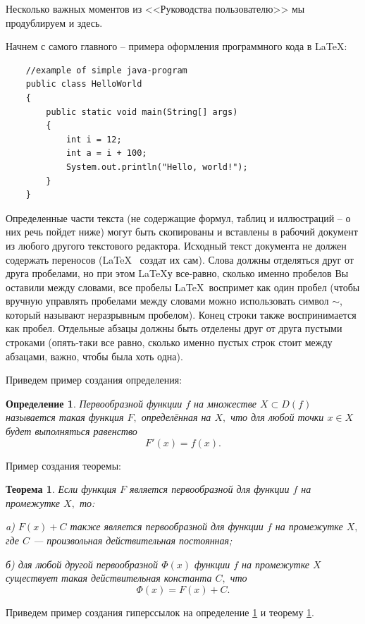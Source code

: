\documentclass[12pt, a4paper]{book}%
\newtheorem{theorem}{\indent \color{red}Теорема}[chapter]
\newtheorem{opr}{\indent \color{red}Определение}[chapter]
\begin{document}
{Несколько важных моментов из <<Руководства пользователю>> мы продублируем и здесь.

Начнем с самого главного -- примера оформления программного кода в \LaTeX:

\begin{lstlisting}
    //example of simple java-program
    public class HelloWorld
    {
        public static void main(String[] args)
        {
            int i = 12;
            int a = i + 100;
            System.out.println("Hello, world!");
        }
    }
\end{lstlisting}

Определенные части текста (не содержащие формул, таблиц и иллюстраций -- о них речь пойдет
ниже) могут быть скопированы и вставлены  в рабочий документ из любого
другого текстового редактора. Исходный текст документа не должен содержать переносов
(\LaTeX~ создат их сам). Слова должны отделяться
друг от друга пробелами, но при этом \LaTeX у все-равно, сколько именно пробелов Вы
оставили между
словами, все пробелы \LaTeX~воспримет как один пробел
 (чтобы вручную управлять пробелами между словами можно использовать символ
$\sim$, который называют неразрывным пробелом).
 Конец строки также воспринимается как пробел.
Отдельные абзацы должны быть отделены друг от друга пустыми строками (опять-таки все равно,
сколько именно пустых строк стоит между абзацами, важно, чтобы была хоть одна).

Приведем пример создания определения:

\begin{opr}\label{oprperv} \rm Первообразной функции $f$ на множестве $X{\subset}D(f)$
называется такая функция $F,$ определённая на $X,$ что для любой
точки $x\in{X}$ будет выполняться равенство
  $$F'(x)=f(x).$$
\end{opr}

Пример создания теоремы:
\begin{theorem}\label{theorperv} Если функция $F$ является первообразной для функции $f$
на промежутке $X,$ то:

   {\rm a)} $F(x)+C$ также является первообразной для функции $f$ на промежутке
$X,$ где $C$ --- произвольная действительная постоянная;

    {\rm б)} для любой
другой первообразной $\Phi(x)$ функции $f$ на промежутке $X$
существует такая действительная константа $C,$ что
  $$\Phi(x)=F(x)+C.$$
\end{theorem}

Приведем пример создания гиперссылок на определение \ref{oprperv}  и теорему \ref{theorperv}.

}
\end{document}
